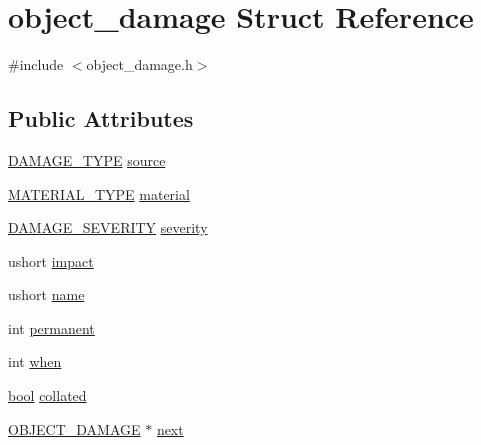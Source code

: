 \hypertarget{structobject__damage}{\section{object\-\_\-damage Struct Reference}
\label{structobject__damage}
}


{\ttfamily \#include $<$object\-\_\-damage.\-h$>$}

\subsection*{Public Attributes}
\begin{DoxyCompactItemize}
\item 
\hyperlink{object__damage_8h_ab80f609de4f2344d8067ac1746dde4a6}{D\-A\-M\-A\-G\-E\-\_\-\-T\-Y\-P\-E} \hyperlink{structobject__damage_a108f533495c2f06bfa2b89209f761486}{source}
\item 
\hyperlink{object__damage_8h_ab2ceeba9e730d841b64f72b35d6278f2}{M\-A\-T\-E\-R\-I\-A\-L\-\_\-\-T\-Y\-P\-E} \hyperlink{structobject__damage_ad76ebd37225ccd91c58b09cc327b2421}{material}
\item 
\hyperlink{object__damage_8h_ad556de0e1a817a16647d92b05159963d}{D\-A\-M\-A\-G\-E\-\_\-\-S\-E\-V\-E\-R\-I\-T\-Y} \hyperlink{structobject__damage_ac029b8185754dd9abcaa9b5d293f8106}{severity}
\item 
ushort \hyperlink{structobject__damage_a96b1eb5eecd0f396ff5c09f6bdda35d2}{impact}
\item 
ushort \hyperlink{structobject__damage_afc74f4142ac05326ca2e12999229d746}{name}
\item 
int \hyperlink{structobject__damage_a1b4e2d08c8a94a65ea4ed403ccb206ae}{permanent}
\item 
int \hyperlink{structobject__damage_a1d60581e627a8a3412a25e3bb2efdca5}{when}
\item 
\hyperlink{structs_8h_ad5c9d4ba3dc37783a528b0925dc981a0}{bool} \hyperlink{structobject__damage_aba937db838e9b0413cbabe8785e9b816}{collated}
\item 
\hyperlink{object__damage_8h_a5a0c6470eee77c8c093bdc24f3e266c0}{O\-B\-J\-E\-C\-T\-\_\-\-D\-A\-M\-A\-G\-E} $\ast$ \hyperlink{structobject__damage_ab2a2e8b2f379bd963dd85c903e407ed3}{next}
\end{DoxyCompactItemize}


